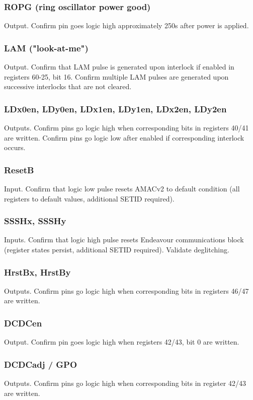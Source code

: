\documentclass[11pt]{article}   			%
\begin{document}
\subsubsection{ROPG (ring oscillator power good)}
Output. Confirm pin goes logic high approximately 250\textmu s after power is applied.

\subsubsection{LAM ("look-at-me")}
Output. Confirm that LAM pulse is generated upon interlock if enabled in registers 60-25, bit 16. 
Confirm multiple LAM pulses are generated upon successive interlocks that are not cleared.

\subsubsection{LDx0en, LDy0en, LDx1en, LDy1en, LDx2en, LDy2en}
Outputs. Confirm pins go logic high when corresponding bits in registers 40/41 are 
written. Confirm pins go logic low after enabled if corresponding interlock occurs.

\subsubsection{ResetB}
Input. Confirm that logic low pulse resets AMACv2 to default condition (all registers to 
default values, additional SETID required).

\subsubsection{SSSHx, SSSHy}
Inputs. Confirm that logic high pulse resets Endeavour communications block (register states 
persist, additional SETID required). Validate deglitching.

\subsubsection{HrstBx, HrstBy}
Outputs. Confirm pins go logic high when corresponding bits in registers 46/47 are
written.

\subsubsection{DCDCen}
Output. Confirm pin goes logic high when registers 42/43, bit 0 are written.

\subsubsection{DCDCadj / GPO}
Outputs. Confirm pins go logic high when corresponding bits in register 42/43 are written.
\end{document}
